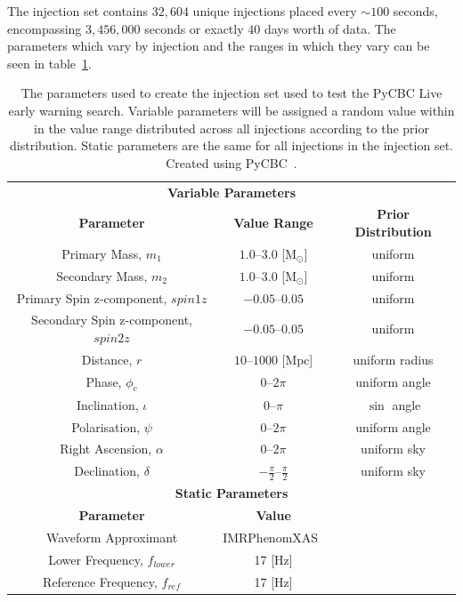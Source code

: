 The injection set contains $32,604$ unique injections placed every ${\sim}100$ seconds, encompassing $3,456,000$ seconds or exactly $40$ days worth of data. The parameters which vary by injection and the ranges in which they vary can be seen in table~\ref{6:tab:ew_inj_params}.
%
\begin{table}[ht]
    \centering
    \setlength{\tabcolsep}{4pt}
    \begin{tabular}{ccc}
        \toprule
        \multicolumn{3}{c}{\textbf{Variable Parameters}} \\
        \cmidrule(lr){1-3}
        \textbf{Parameter} & \textbf{Value Range} & \textbf{Prior Distribution} \\
        \midrule
        Primary Mass, $m_1$ & $1.0\text{--}3.0$ [$\text{M$_{\odot}$}$] & uniform \\
        Secondary Mass, $m_2$ & $1.0\text{--}3.0$ [$\text{M$_{\odot}$}$] & uniform \\
        Primary Spin z-component, $spin1z$ & $-0.05\text{--}0.05$ & uniform \\
        Secondary Spin z-component, $spin2z$ & $-0.05\text{--}0.05$ & uniform \\
        Distance, $r$ & $10\text{--}1000$ [$\text{Mpc}$] & uniform radius \\
        Phase, $\phi_{c}$ & $0\text{--}2\pi$ & uniform angle \\
        Inclination, $\iota$ & $0\text{--}\pi$ & $\sin$ angle \\
        Polarisation, $\psi$ & $0\text{--}2\pi$ & uniform angle \\
        Right Ascension, $\alpha$ & $0\text{--}2\pi$ & uniform sky \\
        Declination, $\delta$ & $-\frac{\pi}{2}\text{--}\frac{\pi}{2}$ & uniform sky \\
        \bottomrule
        \multicolumn{3}{c}{\textbf{Static Parameters}} \\
        \cmidrule(lr){1-3}
        \textbf{Parameter} & \textbf{Value} & \textbf{} \\
        \midrule
        Waveform Approximant & IMRPhenomXAS~\cite{IMRPhenomXAS:2020} & \\
        Lower Frequency, $f_{lower}$ & 17 [$\text{Hz}$] & \\
        Reference Frequency, $f_{ref}$ & 17 [$\text{Hz}$] & \\
        \bottomrule
    \end{tabular}
    \caption{The parameters used to create the injection set used to test the PyCBC Live early warning search. Variable parameters will be assigned a random value within in the value range distributed across all injections according to the prior distribution. Static parameters are the same for all injections in the injection set. Created using PyCBC~\cite{PyCBC_package:2021}.}
    \label{6:tab:ew_inj_params}
\end{table}
